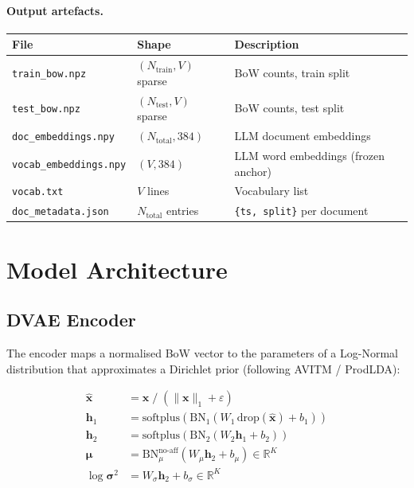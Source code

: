 \documentclass[11pt,a4paper]{article}
\begin{document}
\paragraph{Output artefacts.}
\begin{center}
\begin{tabular}{lll}
\toprule
File & Shape & Description \\
\midrule
\texttt{train\_bow.npz}         & $(N_{\text{train}}, V)$ sparse & BoW counts, train split \\
\texttt{test\_bow.npz}          & $(N_{\text{test}}, V)$ sparse  & BoW counts, test split  \\
\texttt{doc\_embeddings.npy}    & $(N_{\text{total}}, 384)$      & LLM document embeddings \\
\texttt{vocab\_embeddings.npy}  & $(V, 384)$                     & LLM word embeddings (frozen anchor) \\
\texttt{vocab.txt}              & $V$ lines                      & Vocabulary list \\
\texttt{doc\_metadata.json}     & $N_{\text{total}}$ entries     & \texttt{\{ts, split\}} per document \\
\bottomrule
\end{tabular}
\end{center}

\section{Model Architecture}

\subsection{DVAE Encoder}

The encoder maps a normalised BoW vector to the parameters of a Log-Normal distribution
that approximates a Dirichlet prior (following AVITM / ProdLDA):

\begin{align}
  \hat{\mathbf{x}} &= \mathbf{x} \;/\; (\|\mathbf{x}\|_1 + \varepsilon) \label{eq:bow_norm}\\
  \mathbf{h}_1 &= \text{softplus}\!\left(\text{BN}_1(W_1 \,\text{drop}(\hat{\mathbf{x}}) + b_1)\right) \label{eq:enc_h1}\\
  \mathbf{h}_2 &= \text{softplus}\!\left(\text{BN}_2(W_2 \mathbf{h}_1 + b_2)\right) \label{eq:enc_h2}\\
  \boldsymbol{\mu} &= \text{BN}_\mu^{\text{no-aff}}(W_\mu \mathbf{h}_2 + b_\mu)
                    \in \mathbb{R}^K \label{eq:enc_mu}\\
  \log\boldsymbol{\sigma}^2 &= W_{\sigma} \mathbf{h}_2 + b_\sigma
                    \in \mathbb{R}^K \label{eq:enc_logvar}
\end{align}
\end{document}
